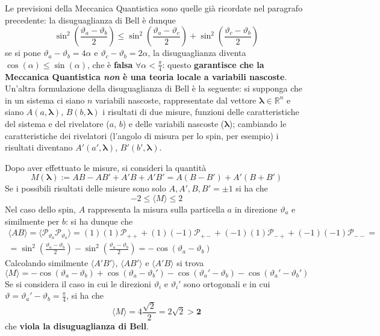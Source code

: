 Le previsioni della Meccanica Quantistica sono quelle già ricordate nel paragrafo precedente:
la disuguaglianza di Bell è dunque
$$\sin^2\left(\frac{\vartheta_a-\vartheta_b}{2}\right)\leq\sin^2\left(\frac{\vartheta_a-\vartheta_c}{2}
\right)+\sin^2\left(\frac{\vartheta_c-\vartheta_b}{2}\right)$$
se si pone $\vartheta_a-\vartheta_b=4\alpha$ e $\vartheta_c-\vartheta_b=2\alpha$, la disuguaglianza
diventa $\cos(\alpha)\leq\sin(\alpha)$, che è \textbf{falsa} $\forall\alpha<\frac{\pi}{4}$:
questo \textbf{garantisce che la Meccanica Quantistica \textit{non} è una teoria locale a variabili
nascoste}.\\

Un'altra formulazione della disuguaglianza di Bell è la seguente: si supponga che in un sistema
ci siano $n$ variabili nascoste, rappresentate dal vettore $\mathbf{\lambda}\in\mathbb{R}^n$ e siano
$A(a,\mathbf{\lambda})$, $B(b,\mathbf{\lambda})$ i risultati di due misure, funzioni delle
caratteristiche del sistema e del rivelatore ($a$, $b$) e delle variabili nascoste
($\mathbf{\lambda}$); cambiando le caratteristiche dei rivelatori (l'angolo di misura per lo spin,
per esempio) i risultati diventano $A'(a',\mathbf{\lambda})$, $B'(b',\mathbf{\lambda})$.

Dopo aver effettuato le misure, si consideri la quantità
$$M(\mathbf{\lambda}):=AB-AB'+A'B+A'B'=A(B-B')+A'(B+B')$$
Se i possibili risultati delle misure sono solo $A,A',B,B'=\pm1$ si ha che
$$-2\leq \langle M\rangle\leq2$$
Nel caso dello spin, $A$ rappresenta la misura sulla particella $a$ in direzione $\vartheta_a$ e
similmente per $b$: si ha dunque che
\begin{gather*}
\langle AB\rangle=\langle\mathcal{P}_{\vartheta_a}\mathcal{P}_{\vartheta_a}\rangle=
(1)(1)\mathcal{P}_{++}+(1)(-1)\mathcal{P}_{+-}+(-1)(1)\mathcal{P}_{-+}+(-1)(-1)\mathcal{P}_{--}=\\
=\sin^2\left(\frac{\vartheta_a-\vartheta_b}{2}\right)-\sin^2\left(\frac{\vartheta_a-\vartheta_b}{2}
\right)=-\cos(\vartheta_a-\vartheta_b)
\end{gather*}
Calcolando similmente $\langle A'B'\rangle$, $\langle AB'\rangle$ e $\langle A'B\rangle$ si trova
$$\langle M\rangle=-\cos(\vartheta_a-\vartheta_b)+\cos(\vartheta_a-\vartheta_b')
-\cos(\vartheta_a'-\vartheta_b)-\cos(\vartheta_a'-\vartheta_b')$$
Se si considera il caso in cui le direzioni $\vartheta_i$ e $\vartheta_i'$ sono ortogonali e in cui
$\vartheta=\vartheta_a'-\vartheta_b=\frac{\pi}{4}$, si ha che
$$\langle M\rangle=4\frac{\sqrt{2}}{2}=2\sqrt{2}\mathbf{>2}$$
che \textbf{viola la disuguaglianza di Bell}.
